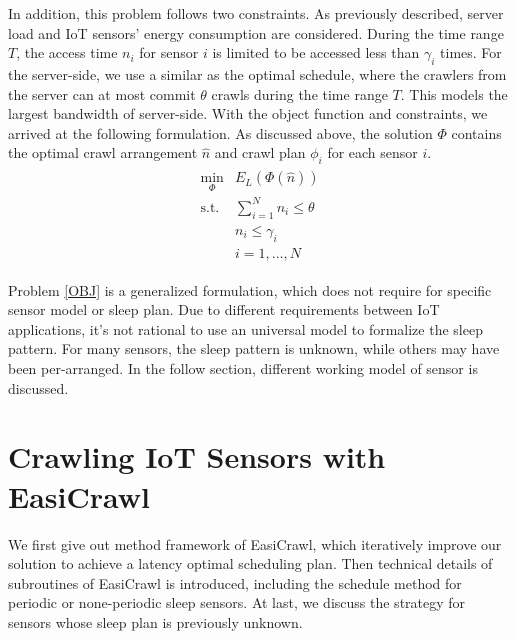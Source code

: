 \documentclass[conference]{IEEEtran}
\begin{document}
In addition, this problem follows two constraints. As previously described, server load and IoT sensors' energy consumption are considered. 
During the time range $T$, the access time $n_i$ for sensor $i$ is limited to be accessed less than $\gamma_i$ times. 
For the server-side, we use a similar as the optimal schedule\cite{Wolf2002}, where the crawlers from the server can at most commit $\theta$ crawls during the time range $T$. This models the largest bandwidth of server-side.
With the object function and constraints, we arrived at the following formulation. As discussed above, the solution $\Phi$ contains the optimal crawl arrangement $\hat{n}$ and crawl plan $\phi_i$ for each sensor $i$.
\begin{eqnarray}
\begin{array}{ll}
\min_{\Phi}& E_L(\Phi(\hat{n}))\\
\text{s.t.}
& \sum_{i=1}^{N} n_i \leq\theta\\
&n_i\leq\gamma_i\\
&i=1,\ldots,N
\end{array}\label{OBJ}
\end{eqnarray}

Problem \eqref{OBJ} is a generalized formulation, which does not require for specific sensor model or sleep plan. Due to different requirements between IoT applications, it's not rational to use an universal model to formalize the sleep pattern. For many sensors, the sleep pattern is unknown, while others may have been per-arranged.  
In the follow section, different working model of sensor is discussed. 


\section{Crawling IoT Sensors with EasiCrawl} \label{easicrawl}

We first give out method framework of EasiCrawl, which iteratively improve our solution to achieve a latency optimal scheduling plan. 
Then technical details of subroutines of EasiCrawl is introduced, including the schedule method for periodic or none-periodic sleep sensors. At last, we discuss the strategy for sensors whose sleep plan is previously unknown.
\end{document}
